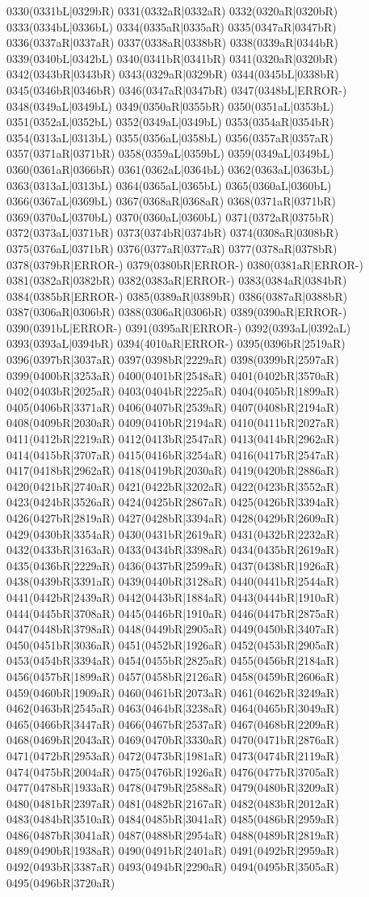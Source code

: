 0330(0331bL|0329bR) 0331(0332aR|0332aR) 0332(0320aR|0320bR) 0333(0334bL|0336bL) 0334(0335aR|0335aR) 0335(0347aR|0347bR) 0336(0337aR|0337aR) 0337(0338aR|0338bR) 0338(0339aR|0344bR) 0339(0340bL|0342bL) 0340(0341bR|0341bR) 0341(0320aR|0320bR) 0342(0343bR|0343bR) 0343(0329aR|0329bR) 0344(0345bL|0338bR) 0345(0346bR|0346bR) 0346(0347aR|0347bR) 0347(0348bL|ERROR-) 0348(0349aL|0349bL) 0349(0350aR|0355bR) 0350(0351aL|0353bL) 0351(0352aL|0352bL) 0352(0349aL|0349bL) 0353(0354aR|0354bR) 0354(0313aL|0313bL) 0355(0356aL|0358bL) 0356(0357aR|0357aR) 0357(0371aR|0371bR) 0358(0359aL|0359bL) 0359(0349aL|0349bL) 0360(0361aR|0366bR) 0361(0362aL|0364bL) 0362(0363aL|0363bL) 0363(0313aL|0313bL) 0364(0365aL|0365bL) 0365(0360aL|0360bL) 0366(0367aL|0369bL) 0367(0368aR|0368aR) 0368(0371aR|0371bR) 0369(0370aL|0370bL) 0370(0360aL|0360bL) 0371(0372aR|0375bR) 0372(0373aL|0371bR) 0373(0374bR|0374bR) 0374(0308aR|0308bR) 0375(0376aL|0371bR) 0376(0377aR|0377aR) 0377(0378aR|0378bR) 0378(0379bR|ERROR-) 0379(0380bR|ERROR-) 0380(0381aR|ERROR-) 0381(0382aR|0382bR) 0382(0383aR|ERROR-) 0383(0384aR|0384bR) 0384(0385bR|ERROR-) 0385(0389aR|0389bR) 0386(0387aR|0388bR) 0387(0306aR|0306bR) 0388(0306aR|0306bR) 0389(0390aR|ERROR-) 0390(0391bL|ERROR-) 0391(0395aR|ERROR-) 0392(0393aL|0392aL) 0393(0393aL|0394bR) 0394(4010aR|ERROR-) 0395(0396bR|2519aR) 0396(0397bR|3037aR) 0397(0398bR|2229aR) 0398(0399bR|2597aR) 0399(0400bR|3253aR) 0400(0401bR|2548aR) 0401(0402bR|3570aR) 0402(0403bR|2025aR) 0403(0404bR|2225aR) 0404(0405bR|1899aR) 0405(0406bR|3371aR) 0406(0407bR|2539aR) 0407(0408bR|2194aR) 0408(0409bR|2030aR) 0409(0410bR|2194aR) 0410(0411bR|2027aR) 0411(0412bR|2219aR) 0412(0413bR|2547aR) 0413(0414bR|2962aR) 0414(0415bR|3707aR) 0415(0416bR|3254aR) 0416(0417bR|2547aR) 0417(0418bR|2962aR) 0418(0419bR|2030aR) 0419(0420bR|2886aR) 0420(0421bR|2740aR) 0421(0422bR|3202aR) 0422(0423bR|3552aR) 0423(0424bR|3526aR) 0424(0425bR|2867aR) 0425(0426bR|3394aR) 0426(0427bR|2819aR) 0427(0428bR|3394aR) 0428(0429bR|2609aR) 0429(0430bR|3354aR) 0430(0431bR|2619aR) 0431(0432bR|2232aR) 0432(0433bR|3163aR) 0433(0434bR|3398aR) 0434(0435bR|2619aR) 0435(0436bR|2229aR) 0436(0437bR|2599aR) 0437(0438bR|1926aR) 0438(0439bR|3391aR) 0439(0440bR|3128aR) 0440(0441bR|2544aR) 0441(0442bR|2439aR) 0442(0443bR|1884aR) 0443(0444bR|1910aR) 0444(0445bR|3708aR) 0445(0446bR|1910aR) 0446(0447bR|2875aR) 0447(0448bR|3798aR) 0448(0449bR|2905aR) 0449(0450bR|3407aR) 0450(0451bR|3036aR) 0451(0452bR|1926aR) 0452(0453bR|2905aR) 0453(0454bR|3394aR) 0454(0455bR|2825aR) 0455(0456bR|2184aR) 0456(0457bR|1899aR) 0457(0458bR|2126aR) 0458(0459bR|2606aR) 0459(0460bR|1909aR) 0460(0461bR|2073aR) 0461(0462bR|3249aR) 0462(0463bR|2545aR) 0463(0464bR|3238aR) 0464(0465bR|3049aR) 0465(0466bR|3447aR) 0466(0467bR|2537aR) 0467(0468bR|2209aR) 0468(0469bR|2043aR) 0469(0470bR|3330aR) 0470(0471bR|2876aR) 0471(0472bR|2953aR) 0472(0473bR|1981aR) 0473(0474bR|2119aR) 0474(0475bR|2004aR) 0475(0476bR|1926aR) 0476(0477bR|3705aR) 0477(0478bR|1933aR) 0478(0479bR|2588aR) 0479(0480bR|3209aR) 0480(0481bR|2397aR) 0481(0482bR|2167aR) 0482(0483bR|2012aR) 0483(0484bR|3510aR) 0484(0485bR|3041aR) 0485(0486bR|2959aR) 0486(0487bR|3041aR) 0487(0488bR|2954aR) 0488(0489bR|2819aR) 0489(0490bR|1938aR) 0490(0491bR|2401aR) 0491(0492bR|2959aR) 0492(0493bR|3387aR) 0493(0494bR|2290aR) 0494(0495bR|3505aR) 0495(0496bR|3720aR) 